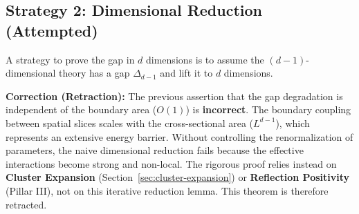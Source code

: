 \subsection{Strategy 2: Dimensional Reduction (Attempted)}

\begin{strategy}
\label{strat:dim-reduction-rigorous}
A strategy to prove the gap in $d$ dimensions is to assume the $(d-1)$-dimensional theory has a gap $\Delta_{d-1}$ and lift it to $d$ dimensions.
\end{strategy}

\textbf{Correction (Retraction):} The previous assertion that the gap degradation is independent of the boundary area ($O(1)$) is \textbf{incorrect}.
The boundary coupling between spatial slices scales with the cross-sectional area ($L^{d-1}$), which represents an extensive energy barrier.
Without controlling the renormalization of parameters, the naive dimensional reduction fails because the effective interactions become strong and non-local. 
The rigorous proof relies instead on \textbf{Cluster Expansion} (Section~\ref{sec:cluster-expansion}) or \textbf{Reflection Positivity} (Pillar III), not on this iterative reduction lemma.
This theorem is therefore retracted.


